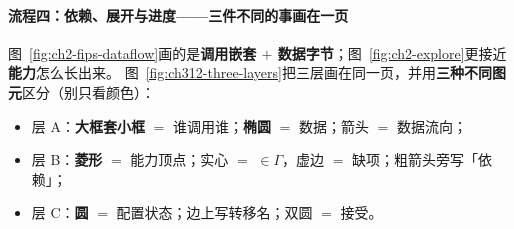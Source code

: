 \documentclass[UTF8,a4paper,11pt]{ctexart}
\theoremstyle{definition}
\theoremstyle{plain}
\theoremstyle{remark}
\numberwithin{figure}{section}
\numberwithin{table}{section}
\begin{document}
\paragraph{流程四：依赖、展开与进度——三件不同的事画在一页}
图~\ref{fig:ch2-fips-dataflow}画的是\textbf{调用嵌套 $+$ 数据字节}；图~\ref{fig:ch2-explore}更接近\textbf{能力}怎么长出来。
图~\ref{fig:ch312-three-layers}把三层画在同一页，并用\textbf{三种不同图元}区分（别只看颜色）：
\begin{itemize}
  \item 层 A：\textbf{大框套小框} $=$ 谁调用谁；\textbf{椭圆} $=$ 数据；箭头 $=$ 数据流向；
  \item 层 B：\textbf{菱形} $=$ 能力顶点；实心 $=$ $\in\Gamma$，虚边 $=$ 缺项；粗箭头旁写「依赖」；
  \item 层 C：\textbf{圆} $=$ 配置状态；边上写转移名；双圆 $=$ 接受。
\end{itemize}
\end{document}
